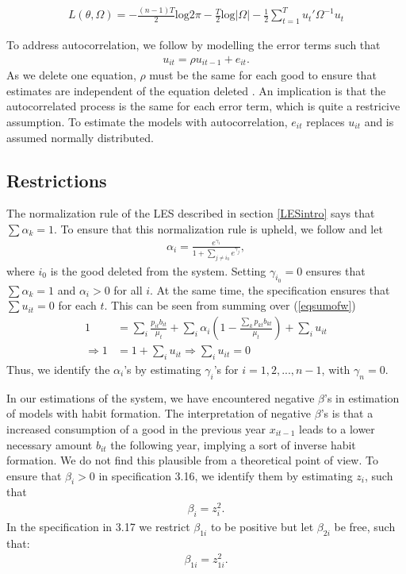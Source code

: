 \begin{align}
    L(\theta,\Omega) = - \frac{(n-1)T}{2} \text{log} 2\pi - \frac{T}{2} \text{log}|\Omega| - \frac{1}{2} \sum_{t=1}^{T} u_t' \Omega^{-1}u_t
\end{align}

To address autocorrelation, we follow \cite{pollak1992demand} by modelling the error terms such that
\begin{align}\label{ac_eq}
    u_{it} = \rho u_{i t-1} + e_{it}.
\end{align}
As we delete one equation, $\rho$ must be the same for each good to ensure that estimates are independent of the equation deleted \citep{pollak1992demand}. An implication is that the autocorrelated process is the same for each error term, which is quite a restricive assumption. To estimate the models with autocorrelation, $e_{it}$ replaces $u_{it}$ and is assumed normally distributed.

\subsection{Restrictions}
The normalization rule of the LES described in section \ref{LESintro} says that 
$\sum \alpha_k=1$. To ensure that this normalization rule is upheld, we follow \cite{stephensen2021note} and let
\begin{align}
    \alpha_i = \frac{e^{\gamma_i}}{1+ \sum_{j\neq i_0} e^{\gamma_j}},
\end{align}
where $i_0$ is the good deleted from the system. Setting $\gamma_{i_0}=0$ ensures that $\sum \alpha_k=1$ and $\alpha_i > 0$ for all $i$. At the same time, the specification ensures that $\sum u_{it} = 0$ for each $t$. This can be seen from summing over (\ref{eqsumofw})
\begin{align}
    1 &= \sum_i  \frac{p_{it} b_{it}}{\mu_t} +  \sum_i \alpha_i \left( 1-\frac{\sum_k p_{kt}b_{kt}}{\mu_t}\right) + \sum_i u_{it} \\
    \Rightarrow 1 &= 1 + \sum_i u_{it} \Rightarrow \sum_i u_{it}=0
\end{align}
Thus, we identify the $\alpha_i$'s by estimating $\gamma_i$'s for $i=1,2,...,n-1$, with $\gamma_n=0$.

In our estimations of the system, we have encountered negative $\beta$'s in estimation of models with habit formation. The interpretation of negative $\beta$'s is that a increased consumption of a good in the previous year $x_{i t-1}$ leads to a lower necessary amount $b_{it}$ the following year, implying a sort of inverse habit formation. We do not find this plausible from a theoretical point of view. To ensure that $\beta_i>0$ in specification 3.16, we identify them by estimating $z_i$, such that
\begin{align}
    \beta_i = z_i^2.
\end{align}
In the specification in 3.17 we restrict $\beta_{1i}$ to be positive but let $\beta_{2i}$ be free, such that:
\begin{align}
    \beta_{1i} = z_{1i}^2.
\end{align}
